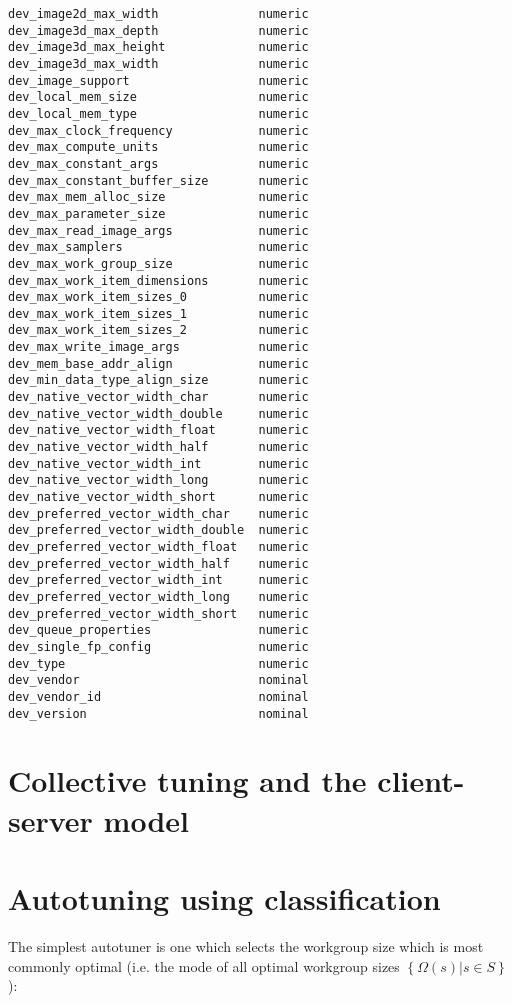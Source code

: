 \begin{multicols}{2}
\begin{Verbatim}[fontsize=\footnotesize]
dev_image2d_max_width              numeric
dev_image3d_max_depth              numeric
dev_image3d_max_height             numeric
dev_image3d_max_width              numeric
dev_image_support                  numeric
dev_local_mem_size                 numeric
dev_local_mem_type                 numeric
dev_max_clock_frequency            numeric
dev_max_compute_units              numeric
dev_max_constant_args              numeric
dev_max_constant_buffer_size       numeric
dev_max_mem_alloc_size             numeric
dev_max_parameter_size             numeric
dev_max_read_image_args            numeric
dev_max_samplers                   numeric
dev_max_work_group_size            numeric
dev_max_work_item_dimensions       numeric
dev_max_work_item_sizes_0          numeric
dev_max_work_item_sizes_1          numeric
dev_max_work_item_sizes_2          numeric
dev_max_write_image_args           numeric
dev_mem_base_addr_align            numeric
dev_min_data_type_align_size       numeric
dev_native_vector_width_char       numeric
dev_native_vector_width_double     numeric
dev_native_vector_width_float      numeric
dev_native_vector_width_half       numeric
dev_native_vector_width_int        numeric
dev_native_vector_width_long       numeric
dev_native_vector_width_short      numeric
dev_preferred_vector_width_char    numeric
dev_preferred_vector_width_double  numeric
dev_preferred_vector_width_float   numeric
dev_preferred_vector_width_half    numeric
dev_preferred_vector_width_int     numeric
dev_preferred_vector_width_long    numeric
dev_preferred_vector_width_short   numeric
dev_queue_properties               numeric
dev_single_fp_config               numeric
dev_type                           numeric
dev_vendor                         nominal
dev_vendor_id                      nominal
dev_version                        nominal
\end{Verbatim}
\end{multicols}


\section{Collective tuning and the client-server model}


\section{Autotuning using classification}

The simplest autotuner is one which selects the workgroup size which
is most commonly optimal (i.e. the mode of all optimal workgroup sizes
$\left\{ \Omega(s) | s \in S \right\}$):

